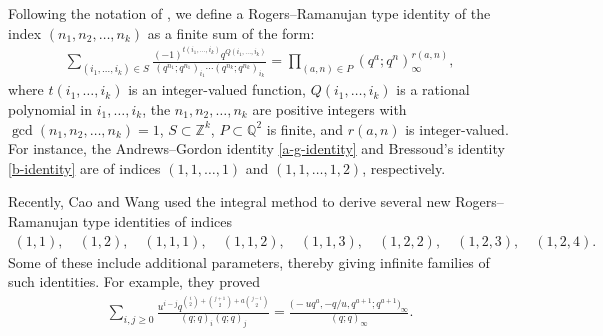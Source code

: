\documentclass[pdftex]{sigma}
\numberwithin{equation}{section}
\theoremstyle{definition}
\begin{document}
Following the notation of \cite{Wang-2023}, we define a Rogers--Ramanujan type identity of the index $(n_1,n_2,\dots,n_k)$ as a finite sum of the form:
\begin{align*}
\sum_{(i_1,\dots,i_k)\in S}\frac{(-1)^{t(i_1,\dots,i_k)}q^{Q(i_1,\dots,i_k)}}{(q^{n_1};q^{n_1})_{i_1}\cdots(q^{n_k};q^{n_k})_{i_k}}=\prod_{(a,n)\in P}(q^a;q^n)^{r(a,n)}_{\infty},
\end{align*}
 where $t(i_1, {\dots}, i_k)$ is an integer-valued function, $Q(i_1, {\dots}, i_k)$ is a rational polynomial in $i_1,{\dots},i_k$, the $n_1,n_2,\dots,n_k$ are positive integers with $\gcd(n_1,n_2,\dots,n_k)=1$, $S\subset\mathbb{Z}^k$, $P\subset\mathbb{Q}^2$ is finite, and $r(a,n)$ is integer-valued. For instance, the Andrews--Gordon identity \eqref{a-g-identity} and Bressoud's identity \eqref{b-identity} are of indices $(1,1,\dots,1)$ and $(1,1,\dots,1,2)$, respectively.\par
Recently, Cao and Wang \cite{Cao-2023} used the integral method to derive several new Rogers--Ra\-manu\-jan type identities of indices
\begin{align*}
(1,1), \quad (1,2), \quad (1,1,1), \quad (1,1,2), \quad (1,1,3), \quad (1,2,2), \quad (1,2,3), \quad (1,2,4).
\end{align*}
Some of these include additional parameters, thereby giving infinite families of such identities. For example, they proved \cite[Theorem~3.4]{Cao-2023}
\begin{align}\label{cao-34}
\sum_{i,j\geq0}\frac{u^{i-j}q^{\binom{i}{2}+\binom{j+1}{2}+a\binom{j-i}{2}}}{(q;q)_i(q;q)_j} =\frac{\bigl(-uq^a,-q/u,q^{a+1};q^{a+1}\bigr)_{\infty}}{(q;q)_{\infty}}.
\end{align}
\end{document}
